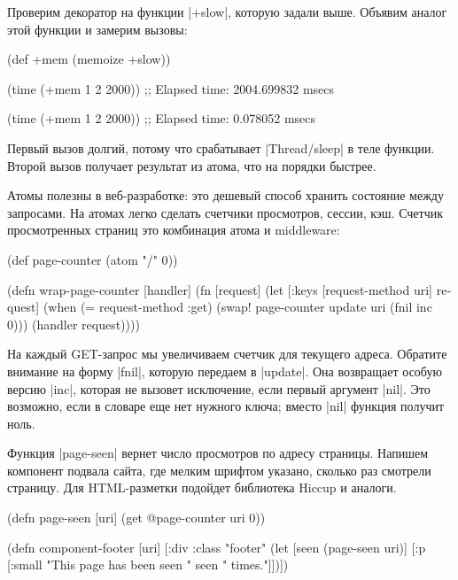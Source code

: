Проверим декоратор на функции \spverb|+slow|, которую задали выше. Объявим
аналог этой функции и замерим вызовы:

\begin{english}
  \begin{clojure}
(def +mem (memoize +slow))

(time (+mem 1 2 2000))
;; Elapsed time: 2004.699832 msecs

(time (+mem 1 2 2000))
;; Elapsed time: 0.078052 msecs
  \end{clojure}
\end{english}

Первый вызов долгий, потому что срабатывает \spverb|Thread/sleep| в теле
функции. Второй вызов получает результат из атома, что на порядки быстрее.

Атомы полезны в веб-разработке: это дешевый способ хранить состояние между
запросами. На атомах легко сделать счетчики просмотров, сессии, кэш. Счетчик
просмотренных страниц это комбинация атома и middleware:

\begin{english}
  \begin{clojure}
(def page-counter
  (atom {"/" 0}))

(defn wrap-page-counter
  [handler]
  (fn [request]
    (let [{:keys [request-method uri]} request]
      (when (= request-method :get)
        (swap! page-counter update uri (fnil inc 0)))
      (handler request))))
  \end{clojure}
\end{english}

На каждый GET-запрос мы увеличиваем счетчик для текущего адреса. Обратите
внимание на форму \spverb|fnil|, которую передаем в \spverb|update|. Она
возвращает особую версию \spverb|inc|, которая не вызовет исключение, если
первый аргумент \spverb|nil|. Это возможно, если в словаре еще нет нужного
ключа; вместо \spverb|nil| функция получит ноль.

Функция \spverb|page-seen| вернет число просмотров по адресу страницы. Напишем
компонент подвала сайта, где мелким шрифтом указано, сколько раз смотрели
страницу. Для HTML-разметки подойдет библиотека
Hiccup и аналоги.

\begin{english}
  \begin{clojure}
(defn page-seen [uri]
  (get @page-counter uri 0))

(defn component-footer [uri]
  [:div {:class "footer"}
   (let [seen (page-seen uri)]
     [:p [:small "This page has been seen " seen " times."]])])
  \end{clojure}
\end{english}

